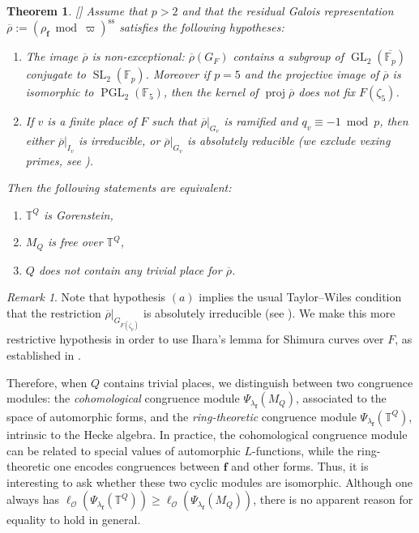 \documentclass[a4paper, notitlepage, 10pt]{amsart}
\theoremstyle{plain} %
\newtheorem{maintheorem}{Theorem}
\theoremstyle{definition} %
\theoremstyle{remark} %
\newtheorem{remark}[theorem]{Remark}
\numberwithin{equation}{section}
\newcommand{\bbF}{\mathbb F}
\newcommand{\bbT}{\mathbb T}
\newcommand{\GL}{\operatorname{GL}} %
\newcommand{\SL}{\operatorname{SL}} %
\newcommand{\PGL}{\operatorname{PGL}} %
\newcommand{\proj}{\operatorname{proj}}
\begin{document}
\begin{maintheorem}\label{maintheorem0}[]
    Assume that $p>2$ and that the residual Galois representation $\overline{\rho}:=(\rho_{\mathbf{f}} \bmod \varpi)^{\text{ss}}$ satisfies the following hypotheses:
\begin{enumerate}
    \item[$(a)$] The image $\overline{\rho}$ is non-exceptional:  $\overline{\rho}(G_F)$ contains a subgroup of $\GL_2(\overline{\bbF_p})$ conjugate to $\SL_2(\bbF_p)$.
    Moreover if $p=5$ and the projective image of $\overline{\rho}$ is isomorphic to $\PGL_2(\bbF_5)$, then the kernel of $\proj\overline{\rho}$ does not fix $F(\zeta_5)$.
    \item[$(b)$] If $v $ is a finite place of $F$ such that $\overline{\rho}|_{G_v}$ is ramified and $q_v\equiv -1 \bmod p$, then either $\overline{\rho}|_{I_v}$ is irreducible, or $\overline{\rho}|_{G_v}$ is absolutely reducible (we exclude vexing primes, see \cite{Dia97}). 
    \end{enumerate} 
        Then the following statements are equivalent:
    \begin{enumerate}
        \item[1.] $\bbT^Q$ is Gorenstein,
        \item[2.]  $M_Q$ is free over $\bbT^Q$,
        \item[3.] $Q$ does not contain any trivial place for $\overline{{\rho}}$.
    \end{enumerate}
\end{maintheorem}
\begin{remark}
    Note that hypothesis $(a)$ implies the usual Taylor--Wiles condition that the restriction $\overline{\rho}|_{G_{F(\zeta_p)}}$ is absolutely irreducible (see \cite[(3.2.3)]{Kis09}). We make this more restrictive hypothesis in order to use Ihara's lemma for Shimura curves over $F$, as established in \cite{MS21}.
\end{remark}

Therefore, when $Q$ contains trivial places, we distinguish between two congruence modules: the \emph{cohomological} congruence module $\Psi_{\lambda_{\mathbf{f}}}(M_Q)$, associated to the space of automorphic forms,  and the \emph{ring-theoretic} congruence module $\Psi_{\lambda_{\mathbf{f}}}(\bbT^Q)$, intrinsic to the Hecke algebra. In practice, the cohomological congruence module can be related to special values of automorphic $L$-functions, while the ring-theoretic one encodes congruences between $\mathbf{f}$ and other forms. Thus, it is interesting to ask whether these
two cyclic modules are isomorphic. Although one always has $\ell_{\mathcal{O}}(\Psi_{\lambda_{\mathbf{f}}}(\bbT^Q))\ge \ell_{\mathcal{O}}(\Psi_{\lambda_{\mathbf{f}}}(M_Q))$, there is no apparent reason for equality to hold in general.
\end{document}
